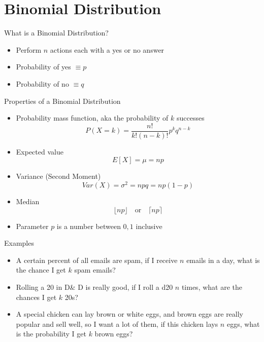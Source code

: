 \documentclass{beamer}
\begin{document}
\section{Binomial Distribution}
\begin{frame}{What is a Binomial Distribution?}
  \begin{itemize}
  \item Perform $n$ actions each with a yes or no answer
  \item Probability of yes $\equiv p$
  \item Probability of no $\equiv q$ 
  \end{itemize}
\end{frame}
\begin{frame}{Properties of a Binomial Distribution}
  \begin{itemize}
  \item Probability mass function, aka the probability of $k$ successes
    \begin{equation*}
      P(X=k)=\frac{n!}{k!(n-k)!}p^kq^{n-k}
    \end{equation*}
  \item Expected value
    \begin{equation*}
      E[X]=\mu=np
    \end{equation*}
  \item Variance (Second Moment)
    \begin{equation*}
      Var(X)=\sigma^2=npq=np(1-p)
    \end{equation*}
  \item Median
    \begin{equation*}
      \lfloor np\rfloor\quad\text{or}\quad\lceil np\rceil
    \end{equation*}
  \item Parameter $p$ is a number between $0,1$ inclusive
  \end{itemize}
\end{frame}
\begin{frame}{Examples}
  \begin{itemize}
  \item A certain percent of all emails are spam, if I receive $n$ emails in a day, what is the chance I get $k$ spam emails?
  \item Rolling a 20 in D\& D is really good, if I roll a d20 $n$ times, what are the chances I get $k$ 20s?
  \item A special chicken can lay brown or white eggs, and brown eggs are really popular and sell well, so I want a lot of them, if this chicken lays $n$ eggs, what is the probability I get $k$ brown eggs?
  \end{itemize}
\end{frame}
\end{document}
